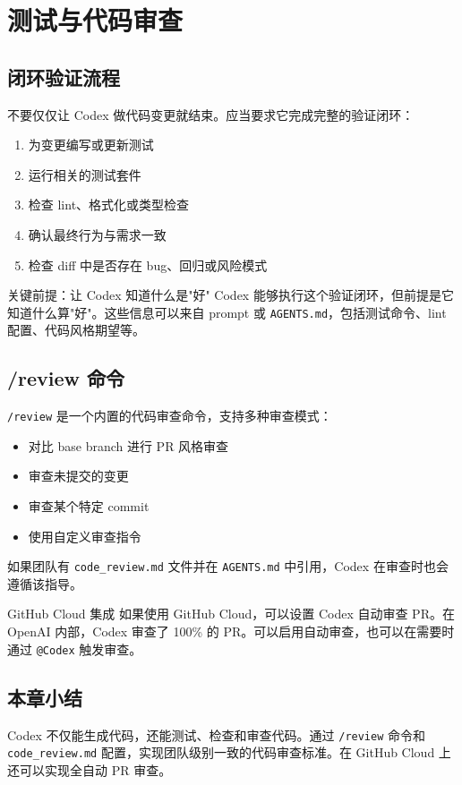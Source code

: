 \section{测试与代码审查}

\subsection{闭环验证流程}

不要仅仅让 Codex 做代码变更就结束。应当要求它完成完整的验证闭环：

\begin{enumerate}[nosep]
    \item 为变更编写或更新测试
    \item 运行相关的测试套件
    \item 检查 lint、格式化或类型检查
    \item 确认最终行为与需求一致
    \item 检查 diff 中是否存在 bug、回归或风险模式
\end{enumerate}

\begin{importantbox}{关键前提：让 Codex 知道什么是"好"}
Codex 能够执行这个验证闭环，但前提是它知道什么算"好"。这些信息可以来自 prompt 或 \texttt{AGENTS.md}，包括测试命令、lint 配置、代码风格期望等。
\end{importantbox}

\subsection{/review 命令}

\texttt{/review} 是一个内置的代码审查命令，支持多种审查模式：

\begin{itemize}
    \item 对比 base branch 进行 PR 风格审查
    \item 审查未提交的变更
    \item 审查某个特定 commit
    \item 使用自定义审查指令
\end{itemize}

如果团队有 \texttt{code\_review.md} 文件并在 \texttt{AGENTS.md} 中引用，Codex 在审查时也会遵循该指导。

\begin{knowledgebox}{GitHub Cloud 集成}
如果使用 GitHub Cloud，可以设置 Codex 自动审查 PR。在 OpenAI 内部，Codex 审查了 100\% 的 PR。可以启用自动审查，也可以在需要时通过 \texttt{@Codex} 触发审查。
\end{knowledgebox}

\subsection{本章小结}

Codex 不仅能生成代码，还能测试、检查和审查代码。通过 \texttt{/review} 命令和 \texttt{code\_review.md} 配置，实现团队级别一致的代码审查标准。在 GitHub Cloud 上还可以实现全自动 PR 审查。

